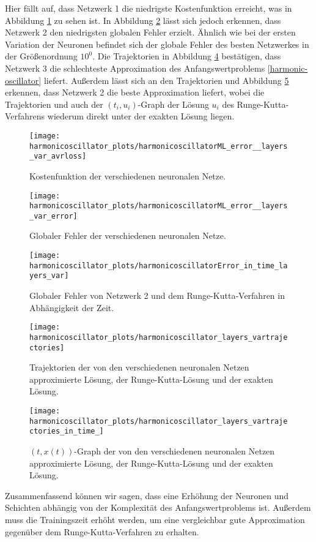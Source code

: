 Hier fällt auf, dass Netzwerk 1 die niedrigste Kostenfunktion erreicht, was in Abbildung
\ref{fig:harmonic-layers-variable-loss} zu sehen ist. In Abbildung \ref{fig:harmonic-layers-variable-error} lässt sich
jedoch erkennen, dass Netzwerk 2 den niedrigsten globalen Fehler erzielt. Ähnlich wie bei der ersten Variation der
Neuronen befindet sich der globale Fehler des besten Netzwerkes in der Größenordnung $10^0$. Die Trajektorien in
Abbildung \ref{fig:harmonic-layers-variable-trajectories} bestätigen, dass Netzwerk 3 die schlechteste Approximation des
Anfangswertproblems \eqref{harmonic-oscillator} liefert. Außerdem lässt sich an den Trajektorien und Abbildung
\ref{fig:harmonic-layers-variable-trajectories-in-time} erkennen, dass Netzwerk 2 die beste Approximation liefert,
wobei die Trajektorien und auch der $(t_i,u_i)$-Graph der Lösung $u_i$ des Runge-Kutta-Verfahrens wiederum direkt unter
der exakten Lösung liegen.
\begin{figure}
       \centering
       \texttt{[image: harmonicoscillator\_plots/harmonicoscillatorML\_error\_\_layers\_var\_avrloss]}
       \caption{Kostenfunktion der verschiedenen neuronalen Netze.}
       \label{fig:harmonic-layers-variable-loss}
\end{figure}
\begin{figure}
       \centering
       \texttt{[image: harmonicoscillator\_plots/harmonicoscillatorML\_error\_\_layers\_var\_error]}
       \caption{Globaler Fehler der verschiedenen neuronalen Netze.}
       \label{fig:harmonic-layers-variable-error}
\end{figure}
\begin{figure}
       \centering
       \texttt{[image: harmonicoscillator\_plots/harmonicoscillatorError\_in\_time\_layers\_var]}
       \caption{Globaler Fehler von Netzwerk 2 und dem Runge-Kutta-Verfahren in Abhängigkeit der Zeit.}
       \label{fig:harmonic-layers-variable-error-in-time}
\end{figure}
\begin{figure}
       \centering
       \texttt{[image: harmonicoscillator\_plots/harmonicoscillator\_layers\_vartrajectories]}
       \caption{Trajektorien der von den verschiedenen neuronalen Netzen approximierte Lösung, der Runge-Kutta-Lösung
       und der exakten Lösung.}
       \label{fig:harmonic-layers-variable-trajectories}
\end{figure}
\begin{figure}
       \centering
       \texttt{[image: harmonicoscillator\_plots/harmonicoscillator\_layers\_vartrajectories\_in\_time\_]}
       \caption{$(t,x(t))$-Graph der von den verschiedenen neuronalen Netzen approximierte Lösung, der
       Runge-Kutta-Lösung und der exakten Lösung.}
       \label{fig:harmonic-layers-variable-trajectories-in-time}
\end{figure}
Zusammenfassend können wir sagen, dass eine Erhöhung der Neuronen und Schichten abhängig von der Komplexität des
Anfangswertproblems ist. Außerdem muss die Trainingszeit erhöht werden, um eine vergleichbar gute Approximation
gegenüber dem Runge-Kutta-Verfahren zu erhalten.
\newpage
